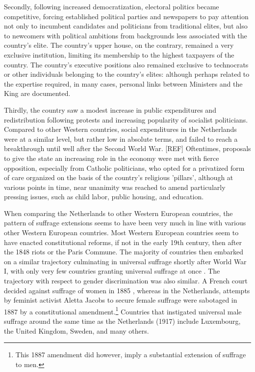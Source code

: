 Secondly, following increased democratization, electoral politics became competitive, forcing established political parties and newspapers to pay attention not only to incumbent candidates and politicians from traditional elites, but also to newcomers with political ambitions from backgrounds less associated with the country's elite. The country's upper house, on the contrary, remained a very exclusive institution, limiting its membership to the highest taxpayers of the country. The country's executive positions also remained exclusive to technocrats or other individuals belonging to the country's elites: although perhaps related to the expertise required, in many cases, personal links between Ministers and the King are documented. \autocite{secker1991ministers}

Thirdly, the country saw a modest increase in public expenditures and redistribution following protests and increasing popularity of socialist politicians. Compared to other Western countries, social expenditures in the Netherlands were at a similar level, but rather low in absolute terms, and failed to reach a breakthrough until well after the Second World War. [REF] Oftentimes, proposals to give the state an increasing role in the economy were met with fierce opposition, especially from Catholic politicians, who opted for a privatized form of care organized on the basis of the country's religious 'pillars', although at various points in time, near unanimity was reached to amend particularly pressing issues, such as child labor, public housing, and education. \autocite{van2013eerste}

When comparing the Netherlands to other Western European countries,  the pattern of suffrage extensions seems to have been very much in line with various other Western European countries. Most Western European countries seem to have enacted constitutional reforms, if not in the early 19th century, then after the 1848 riots or the Paris Commune. The majority of countries then embarked on a similar trajectory culminating in universal suffrage shortly after World War I, with only very few countries granting universal suffrage at once \autocite{caramani2017elections}. The trajectory with respect to gender discrimination was also similar. A French court decided against suffrage of women in 1885 \autocite{przeworski2009conquered}, whereas in the Netherlands, attempts by feminist activist Aletta Jacobs to secure female suffrage were sabotaged in 1887 by a constitutional amendment.\footnote{This 1887 amendment did however, imply a substantial extension of suffrage to men.} Countries that instigated universal male suffrage around the same time as the Netherlands (1917) include Luxembourg, the United Kingdom, Sweden, and many others. \autocite{caramani2017elections}

